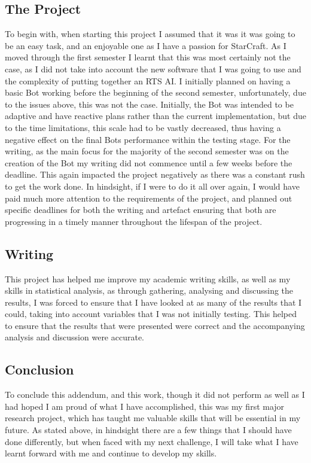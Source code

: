 \documentclass[journal]{IEEEtran}
\begin{document}
	\subsection{The Project}
	To begin with, when starting this project I assumed that it was it was going to be an easy task, and an enjoyable one as I have a passion for StarCraft. As I moved through the first semester I learnt that this was most certainly not the case, as I did not take into account the new software that I was going to use and the complexity of putting together an RTS AI. I initially planned on having a basic Bot working before the beginning of the second semester, unfortunately, due to the issues above, this was not the case. Initially, the Bot was intended to be adaptive and have reactive plans rather than the current implementation, but due to the time limitations, this scale had to be vastly decreased, thus having a negative effect on the final Bots performance within the testing stage. For the writing, as the main focus for the majority of the second semester was on the creation of the Bot my writing did not commence until a few weeks before the deadline. This again impacted the project negatively as there was a constant rush to get the work done. In hindsight, if I were to do it all over again, I would have paid much more attention to the requirements of the project, and planned out specific deadlines for both the writing and artefact ensuring that both are progressing in a timely manner throughout the lifespan of the project.
	
	\subsection{Writing}
	This project has helped me improve my academic writing skills, as well as my skills in statistical analysis, as through gathering, analysing and discussing the results, I was forced to ensure that I have looked at as many of the results that I could, taking into account variables that I was not initially testing. This helped to ensure that the results that were presented were correct and the accompanying analysis and discussion were accurate.
	
	\subsection{Conclusion}
	To conclude this addendum, and this work, though it did not perform as well as I had hoped I am proud of what I have accomplished, this was my first major research project, which has taught me valuable skills that will be essential in my future. As stated above, in hindsight there are a few things that I should have done differently, but when faced with my next challenge, I will take what I have learnt forward with me and continue to develop my skills.
	
\end{document}
